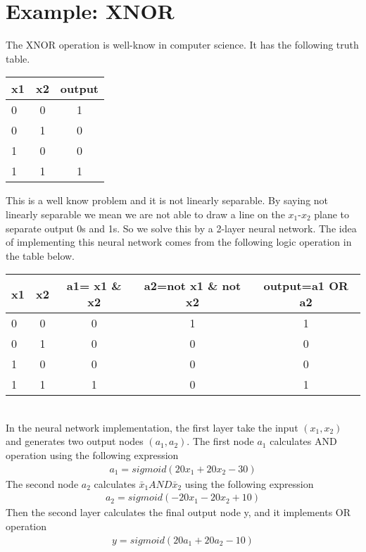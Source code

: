 \documentclass[a4paper]{article}
\begin{document}
\section{Example: XNOR}
The XNOR operation is well-know in computer science. It has the following truth table.\\
\begin{tabular}{ l | c | c }
x1 & x2 & output \\
\hline
0  &  0 & 1 \\
0  &  1 & 0 \\
1  &  0 & 0 \\
1  &  1 & 1 \\
\end{tabular}
This is a well know problem and it is not linearly separable. By saying not linearly separable we mean we are not able to draw a line on the $x_1$-$x_2$ plane to separate output 0s and 1s. So we solve this by a 2-layer neural network. The idea of implementing this neural network comes from the following logic operation in the table below. \\
\begin{tabular}{ l | c | c |c | c}
x1 & x2 & a1= x1 \& x2 & a2=not x1 \& not x2 & output=a1 OR a2 \\
\hline
0  &  0 & 0 & 1 & 1 \\
0  &  1 & 0 & 0 & 0 \\
1  &  0 & 0 & 0 & 0 \\
1  &  1 & 1 & 0 & 1\\
\end{tabular}\\
In the neural network implementation, the first layer take the input $(x_1, x_2)$ and generates two output nodes $(a_1, a_2)$. The first node $a_1$ calculates AND operation using the following expression
\begin{align*}
	a_1 =sigmoid (20 x_1 + 20 x_2 - 30)
\end{align*}
The second node $a_2$ calculates $\bar x_1 AND \bar x_2$ using the following expression
\begin{align*}
	a_2 =sigmoid (-20 x_1 -20 x_2 + 10)
\end{align*}
Then the second layer calculates the final output node y, and it implements OR operation
\begin{align*}
	y = sigmoid (20 a_1 + 20 a_2 -10)
\end{align*}
\end{document}
